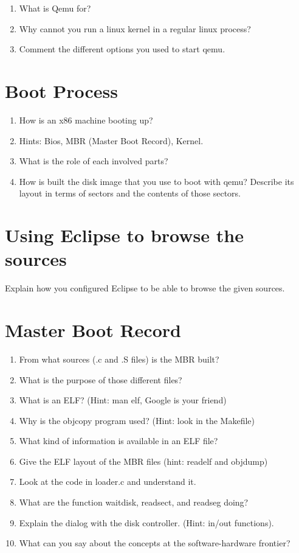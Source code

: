 \documentclass[10]{article}
\begin{document}
\begin{enumerate}
\item 
What is Qemu for?
\item
Why cannot you run a linux kernel in a regular linux process?
\item
Comment the different options you used to start qemu.
\end{enumerate}

\section{Boot Process}

\begin{enumerate}
\item
How is an x86 machine booting up?
\item
Hints: Bios, MBR (Master Boot Record), Kernel.
\item
What is the role of each involved parts?
\item
How is built the disk image that you use to boot with qemu?
Describe its layout in terms of sectors and the contents of 
those sectors.
\end{enumerate}

\section{Using Eclipse to browse the sources} 

Explain how you configured Eclipse to be able to browse the given sources.

\section{Master Boot Record}

\begin{enumerate}
\item
From what sources (.c and .S files) is the MBR built?
\item
What is the purpose of those different files?
\item
What is an ELF? (Hint: man elf, Google is your friend) 
\item
Why is the objcopy program used? (Hint: look in the Makefile)
\item
What kind of information is available in an ELF file?
\item
Give the ELF layout of the MBR files (hint: readelf and objdump) 
\item
Look at the code in loader.c and understand it. 
\item
What are the function waitdisk, readsect, and readseg doing?
\item
Explain the dialog with the disk controller. (Hint: in/out functions).
\item
What can you say about the concepts at the software-hardware frontier?
\end{enumerate}
\end{document}
